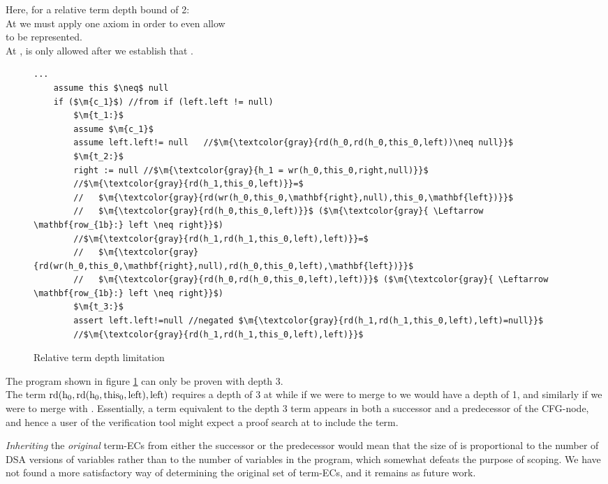 Here, for a relative term depth bound of 2:\\
At  we must apply one axiom in order to even allow \\
 to be represented.\\
At ,  is only allowed after we establish that .

\begin{figure}
\begin{lstlisting}[tabsize=1]
	...
	assume this $\neq$ null
	if ($\m{c_1}$) //from if (left.left != null)
		$\m{t_1:}$
		assume $\m{c_1}$
		assume left.left!= null   //$\m{\textcolor{gray}{rd(h_0,rd(h_0,this_0,left))\neq null}}$
		$\m{t_2:}$
		right := null //$\m{\textcolor{gray}{h_1 = wr(h_0,this_0,right,null)}}$
		//$\m{\textcolor{gray}{rd(h_1,this_0,left)}}=$
		//   $\m{\textcolor{gray}{rd(wr(h_0,this_0,\mathbf{right},null),this_0,\mathbf{left})}}$
		//   $\m{\textcolor{gray}{rd(h_0,this_0,left)}}$ ($\m{\textcolor{gray}{ \Leftarrow \mathbf{row_{1b}:} left \neq right}}$)
		//$\m{\textcolor{gray}{rd(h_1,rd(h_1,this_0,left),left)}}=$
		//   $\m{\textcolor{gray}{rd(wr(h_0,this_0,\mathbf{right},null),rd(h_0,this_0,left),\mathbf{left})}}$
		//   $\m{\textcolor{gray}{rd(h_0,rd(h_0,this_0,left),left)}}$ ($\m{\textcolor{gray}{ \Leftarrow \mathbf{row_{1b}:} left \neq right}}$)
		$\m{t_3:}$
		assert left.left!=null //negated $\m{\textcolor{gray}{rd(h_1,rd(h_1,this_0,left),left)=null}}$
		//$\m{\textcolor{gray}{rd(h_1,rd(h_1,this_0,left),left)}}$
\end{lstlisting}
\caption{Relative term depth limitation}
\label{snippet4.4}
\end{figure}

The program shown in figure \ref{snippet4.4} can only be proven with depth 3.\\
The term $\mathrm{rd(h_0,rd(h_0,this_0,left),left)}$ requires a depth of 3 at 
while if we were to merge  to  we would have a depth of 1, and similarly if we were to merge  with .
Essentially, a term equivalent to the depth 3 term appears in both a successor and a predecessor of the CFG-node, and hence a user of the verification tool might expect a proof search at  to include the term.

\emph{Inheriting} the \emph{original} term-ECs from either the successor or the predecessor would mean that the size of  is proportional to the number of DSA versions of variables rather than to the number of variables in the program, which somewhat defeats the purpose of scoping. We have not found a more satisfactory way of determining the original set of term-ECs, and it remains as future work.

